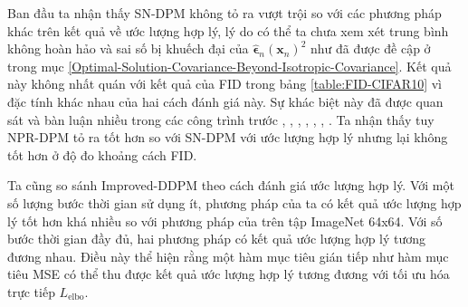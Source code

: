 \documentclass[14pt, a4paper]{article}
\numberwithin{equation}{section}
\numberwithin{figure}{section}
\numberwithin{dl}{section}
\numberwithin{md}{section}
\numberwithin{bd}{section}
\numberwithin{dn}{section}
\numberwithin{hq}{section}
\begin{document}
    Ban đầu ta nhận thấy SN-DPM không tỏ ra vượt trội so với các phương pháp khác trên kết quả về ước lượng hợp lý,
    lý do có thể ta chưa xem xét trung bình không hoàn hảo và sai số bị khuếch đại của $\hat{\boldsymbol{\epsilon}}_n (\boldsymbol{x}_n)^2$ như đã được đề cập ở trong mục \ref{Optimal-Solution-Covariance-Beyond-Isotropic-Covariance}.
    Kết quả này không nhất quán với kết quả của FID trong bảng \ref{table:FID-CIFAR10} vì đặc tính khác nhau của hai cách đánh giá này.
    Sự khác biệt này đã được quan sát và bàn luận nhiều trong các công trình trước \cite{ho2020denoising}, \cite{nichol2021improved}, \cite{song2021maximum}, \cite{vahdat2021score}, \cite{watson2021learning}, \cite{kingma2021variational}, \cite{bao2021analytic}.
    Ta nhận thấy tuy NPR-DPM tỏ ra tốt hơn so với SN-DPM với ước lượng hợp lý nhưng lại không tốt hơn ở độ đo khoảng cách FID.

    Ta cũng so sánh Improved-DDPM \cite{nichol2021improved} theo cách đánh giá ước lượng hợp lý.
    Với một số lượng bước thời gian sử dụng ít, phương pháp của ta có kết quả ước lượng hợp lý tốt hơn khá nhiều so với phương pháp của \cite{nichol2021improved} trên tập ImageNet 64x64.
    Với số bước thời gian đầy đủ, hai phương pháp có kết quả ước lượng hợp lý tương đương nhau.
    Điều này thể hiện rằng một hàm mục tiêu gián tiếp như hàm mục tiêu MSE có thể thu được kết quả ước lượng hợp lý tương đương với tối ưu hóa trực tiếp $L_{\mathrm{elbo}}$.
\end{document}
